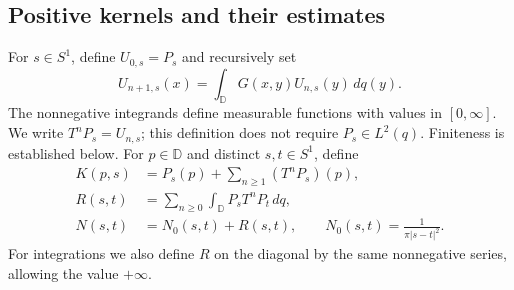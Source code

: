 \subsection{Positive kernels and their estimates}

For $s\in S^1$, define $U_{0,s}=P_s$ and recursively set
\[
 U_{n+1,s}(x)=\int_{\mathbb D}G(x,y)U_{n,s}(y)\,dq(y).
\]
The nonnegative integrands define measurable functions with values in
$[0,\infty]$. We write $T^nP_s=U_{n,s}$; this definition does not
require $P_s\in L^2(q)$. Finiteness is established below.
For $p\in\mathbb D$ and distinct $s,t\in S^1$, define
\begin{align}
 K(p,s)&=P_s(p)+\sum_{n\ge1}(T^nP_s)(p),
                    \label{eq:solution-kernel}\\
 R(s,t)&=\sum_{n\ge0}\int_{\mathbb D}P_sT^nP_t\,dq,
                    \label{eq:interaction-kernel}\\
 N(s,t)&=N_0(s,t)+R(s,t),
 \qquad N_0(s,t)=\frac1{\pi|s-t|^2}.
                    \label{eq:boundary-kernel}
\end{align}
For integrations we also define $R$ on the diagonal by the same
nonnegative series, allowing the value $+\infty$.

